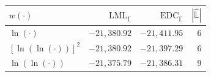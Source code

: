 \begin{tabular}{lrrr}
\toprule
$w(\cdot)$ & $\mbox{LML}_{\widehat{\mathbb{L}}}$ & $\mbox{EDC}_{\widehat{\mathbb{L}}}$ & $|\widehat{\mathbb{L}}|$  \\
\midrule
$\ln(\cdot)$            & $-21{,}380.92$ & $-21{,}411.95$ & 6  \\
$[\ln(\ln(\cdot))]^2$   & $-21{,}380.92$ & $-21{,}397.29$ & 6  \\
$\ln(\ln(\cdot))$       & $-21{,}375.79$ & $-21{,}386.31$ & 9  \\
\bottomrule
\end{tabular}
